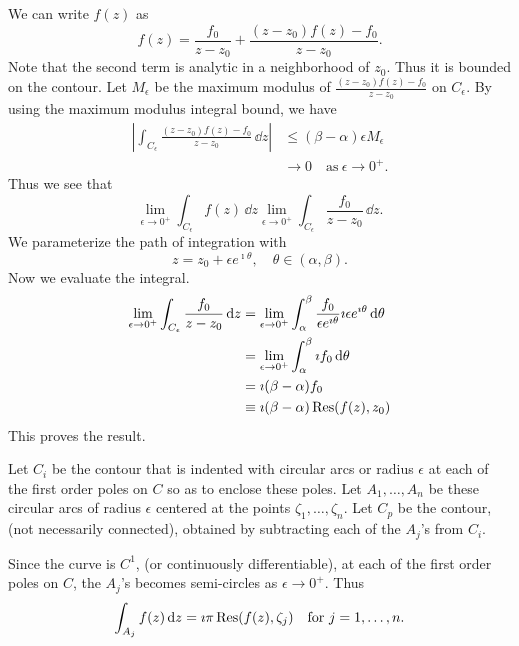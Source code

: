 {%
\begin{Solution}
  \label{solution int ce f(z)}
  We can write $f(z)$ as
  \[
  f(z) = \frac{f_0}{z-z_0} + \frac{(z-z_0) f(z) - f_0}{z-z_0}.
  \]
  Note that the second term is analytic in a neighborhood of $z_0$.  Thus it
  is bounded on the contour.  Let $M_\epsilon$ be the maximum modulus of
  $\frac{(z-z_0) f(z) - f_0}{z-z_0}$ on $C_\epsilon$. 
  By using the maximum modulus integral bound, we have
  \begin{align*}
    \left| \int_{C_\epsilon} \frac{(z-z_0)f(z) -f_0}{z-z_0} \,\dd z \right|
    &\leq (\beta - \alpha) \epsilon M_\epsilon \\
    & \to 0 \quad \mathrm{as}\ \epsilon \to 0^+.
  \end{align*}
  Thus we see that
  \[
  \lim_{\epsilon \to 0^+} \int_{C_\epsilon} f(z) \,\dd z
  \lim_{\epsilon \to 0^+} \int_{C_\epsilon} \frac{f_0}{z-z_0} \,\dd z.
  \]
  We parameterize the path of integration with
  \[
  z = z_0 + \epsilon e^{\imath \theta}, \quad \theta \in (\alpha,\beta).
  \]
  Now we evaluate the integral.
  \begin{align*}
    \lim_{\epsilon \to 0^+} \int_{C_\epsilon} \frac{f_0}{z-z_0} \,\mathrm{d} z
    &=\lim_{\epsilon \to 0^+} 
    \int_\alpha^\beta \frac{f_0}{\epsilon e^{\imath \theta}} 
    \imath \epsilon e^{\imath \theta}\,\mathrm{d} \theta \\
    &=\lim_{\epsilon \to 0^+} 
    \int_\alpha^\beta \imath f_0 \,\mathrm{d} \theta \\
    &= \imath (\beta - \alpha) f_0 \\
    &\equiv \imath (\beta - \alpha) \mathop{\mathrm{Res}}\nolimits( f(z), z_0 )
  \end{align*}
  This proves the result.
\end{Solution}



\begin{Solution}
  \label{solution cpv res thrm}
  Let $C_i$ be the contour that is indented with circular arcs or radius
  $\epsilon$ at each of the first order poles on $C$ so as to enclose 
  these poles.  Let $A_1,\ldots,A_n$ be these circular arcs of radius
  $\epsilon$ centered at the points $\zeta_1,\ldots,\zeta_n$.  Let $C_p$ 
  be the contour, (not necessarily connected), obtained by subtracting 
  each of the $A_j$'s from $C_i$.

  Since the curve is $C^1$, (or continuously differentiable), at each of the
  first order poles on $C$, the $A_j$'s becomes semi-circles as 
  $\epsilon \to 0^+$.  Thus 
  \[
  \int_{A_j} f(z) \,\mathrm{d} z = \imath \pi \mathop{\mathrm{Res}}\nolimits(f(z),\zeta_j) \quad \mathrm{for}\ j = 1,\ldots,n.
  \]


\end{Solution}}
